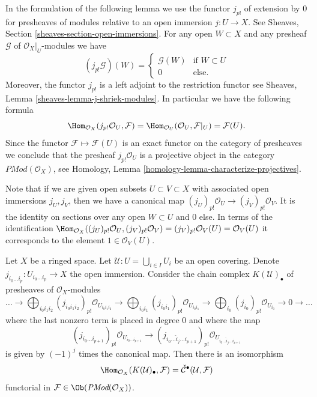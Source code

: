 \noindent
In the formulation of the following lemma we use the functor $j_{p!}$ of
extension by $0$ for presheaves of modules
relative to an open immersion $j : U \to X$.
See Sheaves, Section \ref{sheaves-section-open-immersions}. For any open
$W \subset X$ and any presheaf $\mathcal{G}$ of $\mathcal{O}_X|_U$-modules
we have
$$
(j_{p!}\mathcal{G})(W) =
\left\{
\begin{matrix}
\mathcal{G}(W) & \text{if } W \subset U \\
0 & \text{else.}
\end{matrix}
\right.
$$
Moreover, the functor $j_{p!}$ is a left adjoint to the restriction functor
see Sheaves, Lemma \ref{sheaves-lemma-j-shriek-modules}.
In particular we have the following formula
$$
\Hom_{\mathcal{O}_X}(j_{p!}\mathcal{O}_U, \mathcal{F})
=
\Hom_{\mathcal{O}_U}(\mathcal{O}_U, \mathcal{F}|_U)
=
\mathcal{F}(U).
$$
Since the functor $\mathcal{F} \mapsto \mathcal{F}(U)$ is an exact functor
on the category of presheaves we conclude that the presheaf
$j_{p!}\mathcal{O}_U$ is a projective object in the category
$\textit{PMod}(\mathcal{O}_X)$, see
Homology, Lemma \ref{homology-lemma-characterize-projectives}.

\medskip\noindent
Note that if we are given open subsets $U \subset V \subset X$
with associated open immersions $j_U, j_V$, then we have a canonical
map $(j_U)_{p!}\mathcal{O}_U \to (j_V)_{p!}\mathcal{O}_V$. It is the
identity on sections over any open $W \subset U$ and $0$ else.
In terms of the identification
$\Hom_{\mathcal{O}_X}((j_U)_{p!}\mathcal{O}_U, (j_V)_{p!}\mathcal{O}_V) =
(j_V)_{p!}\mathcal{O}_V(U) = \mathcal{O}_V(U)$ it corresponds to
the element $1 \in \mathcal{O}_V(U)$.

\begin{lemma}
\label{lemma-cech-map-into}
Let $X$ be a ringed space.
Let $\mathcal{U} : U = \bigcup_{i \in I} U_i$ be an open covering.
Denote $j_{i_0\ldots i_p} : U_{i_0 \ldots i_p} \to X$ the open immersion.
Consider the chain complex $K(\mathcal{U})_\bullet$
of presheaves of $\mathcal{O}_X$-modules
$$
\ldots
\to
\bigoplus_{i_0i_1i_2} (j_{i_0i_1i_2})_{p!}\mathcal{O}_{U_{i_0i_1i_2}}
\to
\bigoplus_{i_0i_1} (j_{i_0i_1})_{p!}\mathcal{O}_{U_{i_0i_1}}
\to
\bigoplus_{i_0} (j_{i_0})_{p!}\mathcal{O}_{U_{i_0}}
\to 0 \to \ldots
$$
where the last nonzero term is placed in degree $0$
and where the map
$$
(j_{i_0\ldots i_{p + 1}})_{p!}\mathcal{O}_{U_{i_0\ldots i_{p + 1}}}
\longrightarrow
(j_{i_0\ldots \hat i_j \ldots i_{p + 1}})_{p!}
\mathcal{O}_{U_{i_0\ldots \hat i_j \ldots i_{p + 1}}}
$$
is given by $(-1)^j$ times the canonical map.
Then there is an isomorphism
$$
\Hom_{\mathcal{O}_X}(K(\mathcal{U})_\bullet, \mathcal{F})
=
\check{\mathcal{C}}^\bullet(\mathcal{U}, \mathcal{F})
$$
functorial in $\mathcal{F} \in \Ob(\textit{PMod}(\mathcal{O}_X))$.
\end{lemma}

